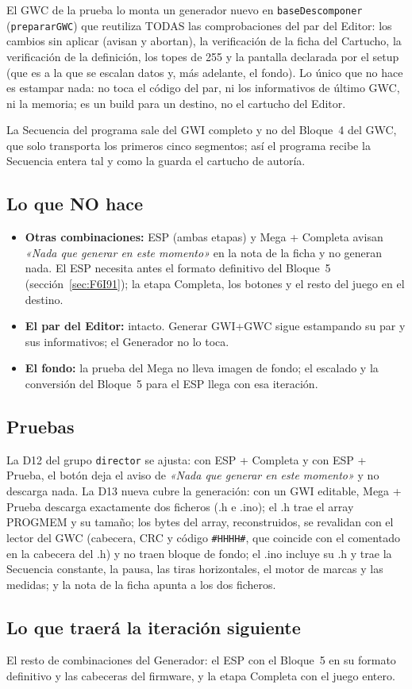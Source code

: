 El GWC de la prueba lo monta un generador nuevo en \texttt{baseDescomponer} (\texttt{prepararGWC}) que reutiliza TODAS las comprobaciones del par del Editor: los cambios sin aplicar (avisan y abortan), la verificación de la ficha del Cartucho, la verificación de la definición, los topes de 255 y la pantalla declarada por el setup (que es a la que se escalan datos y, más adelante, el fondo). Lo único que no hace es estampar nada: no toca el código del par, ni los informativos de último GWC, ni la memoria; es un build para un destino, no el cartucho del Editor.

La Secuencia del programa sale del GWI completo y no del Bloque~4 del GWC, que solo transporta los primeros cinco segmentos; así el programa recibe la Secuencia entera tal y como la guarda el cartucho de autoría.

\subsection{Lo que NO hace}
\label{sec:F6I04Limites}

\begin{itemize}
	\item \textbf{Otras combinaciones:} ESP (ambas etapas) y Mega + Completa avisan \emph{«Nada que generar en este momento»} en la nota de la ficha y no generan nada. El ESP necesita antes el formato definitivo del Bloque~5 (sección~\ref{sec:F6I91}); la etapa Completa, los botones y el resto del juego en el destino.
	\item \textbf{El par del Editor:} intacto. Generar GWI+GWC sigue estampando su par y sus informativos; el Generador no lo toca.
	\item \textbf{El fondo:} la prueba del Mega no lleva imagen de fondo; el escalado y la conversión del Bloque~5 para el ESP llega con esa iteración.
\end{itemize}

\subsection{Pruebas}
\label{sec:F6I04Pruebas}

La D12 del grupo \texttt{director} se ajusta: con ESP + Completa y con ESP + Prueba, el botón deja el aviso de \emph{«Nada que generar en este momento»} y no descarga nada. La D13 nueva cubre la generación: con un GWI editable, Mega + Prueba descarga exactamente dos ficheros (.h e .ino); el .h trae el array PROGMEM y su tamaño; los bytes del array, reconstruidos, se revalidan con el lector del GWC (cabecera, CRC y código \texttt{\#HHHH\#}, que coincide con el comentado en la cabecera del .h) y no traen bloque de fondo; el .ino incluye su .h y trae la Secuencia constante, la pausa, las tiras horizontales, el motor de marcas y las medidas; y la nota de la ficha apunta a los dos ficheros.

\subsection{Lo que traerá la iteración siguiente}
\label{sec:F6I04Siguiente}

El resto de combinaciones del Generador: el ESP con el Bloque~5 en su formato definitivo y las cabeceras del firmware, y la etapa Completa con el juego entero.
